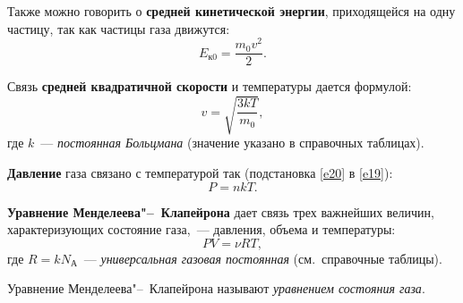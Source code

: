 \documentclass[main.tex]{subfiles}
\begin{document}
Также можно говорить о \textbf{средней кинетической энергии}, приходящейся на одну частицу, так как частицы газа движутся:
\begin{equation}
    E_\text{к0}=\frac{m_0v^2}{2}.
\end{equation}

Связь \textbf{средней квадратичной скорости} и температуры дается формулой:
\begin{equation}
    \label{e20}
    v=\sqrt{\frac{3kT}{m_0}},
\end{equation}
где $k$~--- \emph{постоянная Больцмана} (значение указано в справочных таблицах).


\textbf{Давление} газа связано с температурой так (подстановка \eqref{e20} в \eqref{e19}): 
\begin{equation}
    P=nkT.
\end{equation}

\textbf{Уравнение Менделеева"--~Клапейрона} дает связь трех важнейших величин, характеризующих состояние газа,~--- давления, объема и температуры:
\begin{equation}
    PV=\nu RT,
\end{equation}
где
$R=kN_\text{А}$~--- \emph{универсальная газовая постоянная} (см.~справочные таблицы).


Уравнение Менделеева"--~Клапейрона называют \emph{уравнением состояния газа}.



 
\end{document}

